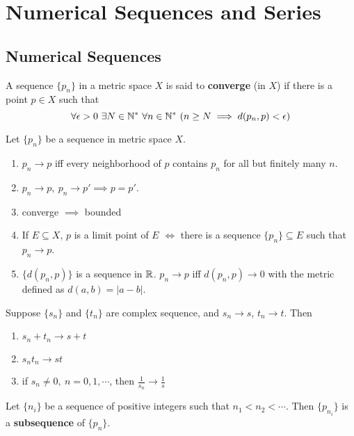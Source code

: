 \section{Numerical Sequences and Series}
    \subsection{Numerical Sequences}
    \begin{defi}
        A sequence $\{p_n\}$ in a metric space $X$ is said to \textbf{converge} (in $X$) if there is a point $p \in X$ such that
        \begin{equation}
            \forall \epsilon > 0 \ \exists N \in \mathbb{N}^* \ \forall n \in \mathbb{N}^* \ (n \geq N \implies d(p_n, p) < \epsilon)
        \end{equation}
    \end{defi}
    \begin{theo}
        Let $\{p_n\}$ be a sequence in metric space $X$.
        \begin{enumerate}
            \item $p_n \to p$ iff every neighborhood of $p$ contains $p_n$ for all but finitely many $n$.
            \item $p_n \to p, \ p_n \to p' \implies p = p'$.
            \item converge $\implies$ bounded
            \item If $E \subseteq X$, $p$ is a limit point of $E$ $\Longleftrightarrow$ there is a sequence $\{p_n\} \subseteq E$ such that $p_n \to p$.
            \item $\{d(p_n, p)\}$ is a sequence in $\mathbb{R}$. $p_n \to p$ iff $d(p_n, p) \to 0$ with the metric defined as $d(a,b) = | a-b |$.
        \end{enumerate}
    \end{theo}
    \begin{theo}
        Suppose $\{s_n\}$ and $\{t_n\}$ are complex sequence, and $s_n \to s$, $t_n \to t$. Then
        \begin{enumerate}
            \item $s_n + t_n \to s + t$
            \item $s_nt_n \to st$
            \item if $s_n \neq 0,\ n=0,1,\cdots$, then $\frac{1}{s_n} \to \frac{1}{s}$
        \end{enumerate}
    \end{theo}

    \begin{defi}
        Let $\{n_i\}$ be a sequence of positive integers such that $n_1 < n_2 < \cdots $. Then $\{p_{n_i}\}$ is a \textbf{subsequence} of $\{ p_n \}$.
    \end{defi}

